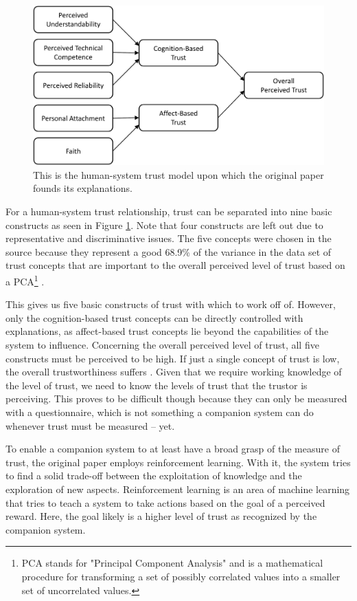 \documentclass[a4paper]{article}
\begin{document}
\begin{figure}[H]
	\centering
	\includegraphics[width=12cm]{trust.png}
	\caption{This is the human-system trust model upon which the original paper founds its explanations.}
	\label{fig:hs_trust}
\end{figure}

For a human-system trust relationship, trust can be separated into nine basic constructs as seen in Figure \ref{fig:hs_trust}. Note that four constructs are left out due to representative and discriminative issues. The five concepts were chosen in the source because they represent a good 68.9\% of the variance in the data set of trust concepts that are important to the overall perceived level of trust based on a PCA\footnote{PCA stands for "Principal Component Analysis" and is a mathematical procedure for transforming a set of possibly correlated values into a smaller set of uncorrelated values.} \cite{htc}.

This gives us five basic constructs of trust with which to work off of. However, only the cognition-based trust concepts can be directly controlled with explanations, as affect-based trust concepts lie beyond the capabilities of the system to influence. Concerning the overall perceived level of trust, all five constructs must be perceived to be high. If just a single concept of trust is low, the overall trustworthiness suffers \cite{htc}. Given that we require working knowledge of the level of trust, we need to know the levels of trust that the trustor is perceiving. This proves to be difficult though because they can only be measured with a questionnaire, which is not something a companion system can do whenever trust must be measured – yet.

To enable a companion system to at least have a broad grasp of the measure of trust, the original paper employs reinforcement learning. With it, the system tries to find a solid trade-off between the exploitation of knowledge and the exploration of new aspects. Reinforcement learning is an area of machine learning that tries to teach a system to take actions based on the goal of a perceived reward. Here, the goal likely is a higher level of trust as recognized by the companion system.
\end{document}
